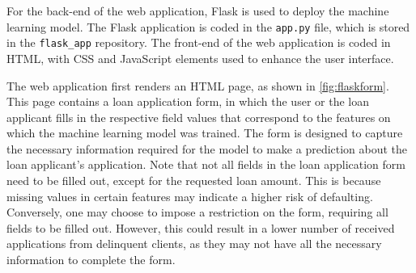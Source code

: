 For the back-end of the web application, Flask is used to deploy the machine learning model. The Flask application is coded in the \lstinline{app.py} file, which is stored in the \lstinline{flask_app} repository. The front-end of the web application is coded in HTML, with CSS and JavaScript elements used to enhance the user interface.
 
The web application first renders an HTML page, as shown in \autoref{fig:flaskform}.
This page contains a loan application form, in which the user or the loan applicant fills in the respective field values that correspond to the features on which the machine learning model was trained.
The form is designed to capture the necessary information required for the model to make a prediction about the loan applicant's application.
Note that not all fields in the loan application form need to be filled out, except for the requested loan amount. This is because missing values in certain features may indicate a higher risk of defaulting. Conversely, one may choose to impose a restriction on the form, requiring all fields to be filled out. However, this could result in a lower number of received applications from delinquent clients, as they may not have all the necessary information to complete the form.

